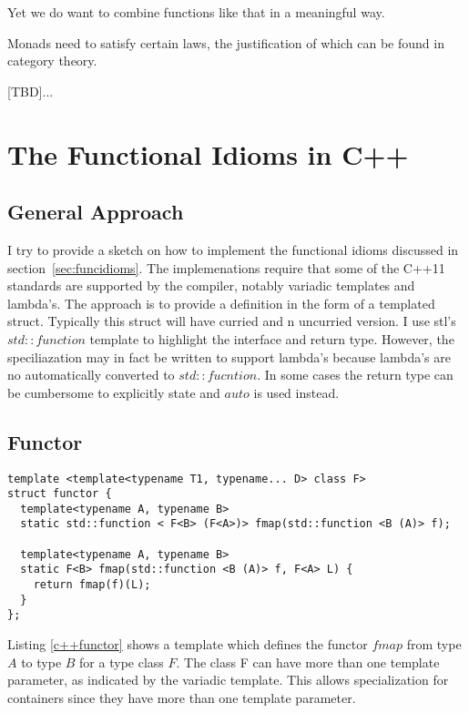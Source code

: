 \documentclass[12pt,fleqn]{article}
\begin{document}
Yet we do want  to combine functions like that in a meaningful way. 

Monads need to satisfy certain laws, the justification of which can be found in category theory.

[TBD]...


%
%
\section{The Functional Idioms in C++}
%
%
%

\subsection{General Approach}

I try to provide a sketch on how to implement the functional idioms discussed in section~\ref{sec:funcidioms}.
The implemenations require that some of the C++11 standards are supported by the compiler, notably variadic templates and lambda's.
The approach is to provide a definition in the form of a templated struct. 
Typically this struct will have curried and n uncurried version.
I use stl's $std::function$ template to highlight the interface and return type. 
However, the speciliazation may in fact be written to support lambda's because lambda's are no automatically converted to
$std::fucntion$. 
In some cases the return type can be cumbersome to explicitly state and $auto$ is used instead.


\subsection{Functor}
%
\begin{minipage}{\linewidth}
\begin{lstlisting}[caption=functor in C++, label=c++functor]
template <template<typename T1, typename... D> class F>
struct functor {
  template<typename A, typename B>
  static std::function < F<B> (F<A>)> fmap(std::function <B (A)> f);

  template<typename A, typename B>
  static F<B> fmap(std::function <B (A)> f, F<A> L) {
    return fmap(f)(L);
  }
};
\end{lstlisting}
\end{minipage}
%
%
%
Listing \ref{c++functor} shows a template which defines the functor $fmap$ from type $A$ to type $B$ for a type class $F$. 
The class F can have more than one template parameter, as indicated by the variadic template.
This allows specialization for containers since they have more than one template parameter.
\end{document}
